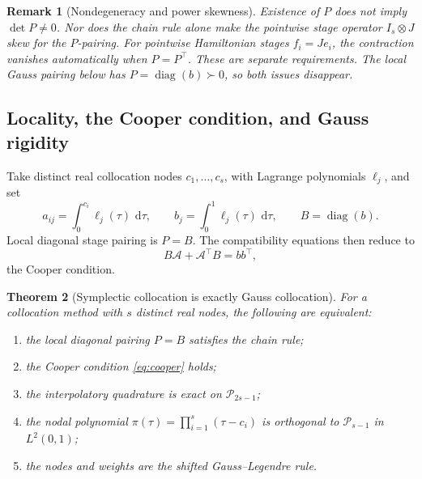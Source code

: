 \documentclass[11pt,a4paper]{article}
\newtheorem{theorem}{Theorem}[section]
\newtheorem{remark}[theorem]{Remark}
\newcommand{\cP}{\mathcal P}
\newcommand{\dd}{\,\mathrm d}
\newcommand{\diag}{\operatorname{diag}}
\begin{document}
\begin{remark}[Nondegeneracy and power skewness]
Existence of \(P\) does not imply \(\det P\ne0\). Nor does the chain rule
alone make the pointwise stage operator \(I_s\otimes J\) skew for the
\(P\)-pairing. For pointwise Hamiltonian stages \(f_i=Je_i\), the
contraction vanishes automatically when \(P=P^\top\). These are separate
requirements. The local Gauss pairing below has
\(P=\diag(b)\succ0\), so both issues disappear.
\end{remark}

\subsection{Locality, the Cooper condition, and Gauss rigidity}

Take distinct real collocation nodes \(c_1,\ldots,c_s\), with Lagrange
polynomials \(\ell_j\), and set
\begin{equation}\label{eq:collocation}
 a_{ij}=\int_0^{c_i}\ell_j(\tau)\,\dd\tau,\qquad
 b_j=\int_0^1\ell_j(\tau)\,\dd\tau,\qquad
 B=\diag(b).
\end{equation}
Local diagonal stage pairing is \(P=B\). The compatibility equations then
reduce to
\begin{equation}\label{eq:cooper}
 B\mathcal A+\mathcal A^\top B=bb^\top,
\end{equation}
the Cooper condition.

\begin{theorem}[Symplectic collocation is exactly Gauss collocation]
\label{thm:gauss-rigidity}
For a collocation method with \(s\) distinct real nodes, the following
are equivalent:
\begin{enumerate}
  \item the local diagonal pairing \(P=B\) satisfies the chain rule;
  \item the Cooper condition \cref{eq:cooper} holds;
  \item the interpolatory quadrature is exact on \(\cP_{2s-1}\);
  \item the nodal polynomial
  \(\pi(\tau)=\prod_{i=1}^s(\tau-c_i)\) is orthogonal to
  \(\cP_{s-1}\) in \(L^2(0,1)\);
  \item the nodes and weights are the shifted Gauss--Legendre rule.
\end{enumerate}
\end{theorem}
\end{document}
